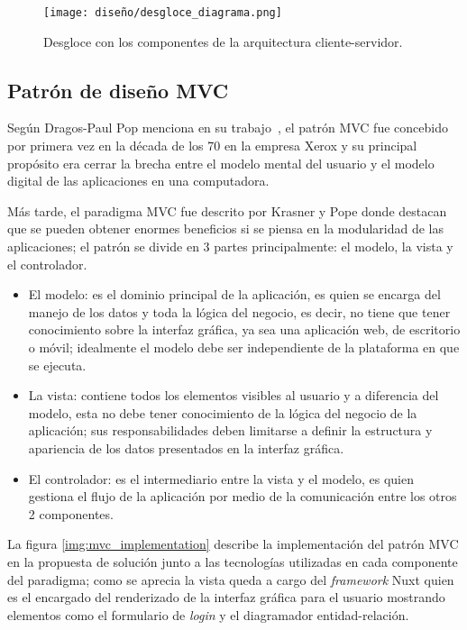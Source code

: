 \begin{figure}[H]
  \centering
  \texttt{[image: diseño/desgloce\_diagrama.png]}
  \caption{Desgloce con los componentes de la arquitectura cliente-servidor.}
  \label{img:desgloce_arquitectura}
\end{figure}


\subsection{Patrón de diseño MVC}

Según Dragos-Paul Pop menciona en su trabajo~\cite{pop_designing_2014}, el patrón MVC fue concebido por primera vez en la década de los 70 en la empresa Xerox y su principal propósito era cerrar la brecha entre el modelo mental del usuario y el modelo digital de las aplicaciones en una computadora.


Más tarde, el paradigma MVC fue descrito por Krasner y Pope\cite{pope_cookbook_1988} donde destacan que se pueden obtener enormes beneficios si se piensa en la modularidad de las aplicaciones; el patrón se divide en 3 partes principalmente: el modelo, la vista y el controlador.

\begin{itemize}
    \item El modelo: es el dominio principal de la aplicación, es quien se encarga del manejo de los datos y toda la lógica del negocio, es decir, no tiene que tener conocimiento sobre la interfaz gráfica, ya sea una aplicación web, de escritorio o móvil; idealmente el modelo debe ser independiente de la plataforma en que se ejecuta.
    \item La vista: contiene todos los elementos visibles al usuario y a diferencia del modelo, esta no debe tener conocimiento de la lógica del negocio de la aplicación; sus responsabilidades deben limitarse a definir la estructura y apariencia de los datos presentados en la interfaz gráfica.
    \item El controlador: es el intermediario entre la vista y el modelo, es quien gestiona el flujo de la aplicación por medio de la comunicación entre los otros 2 componentes.
\end{itemize}

La figura \ref{img:mvc_implementation} describe la implementación del patrón MVC en la propuesta de solución junto a las tecnologías utilizadas en cada componente del paradigma; como se aprecia la vista queda a cargo del \textit{framework} Nuxt quien es el encargado del renderizado de la interfaz gráfica para el usuario mostrando elementos como el formulario de \textit{login} y el diagramador entidad-relación.

